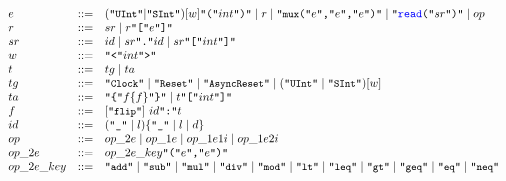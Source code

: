 \begin{figure}[htbp]
{\[\begin{array}{l l l}
%
e & ::= & (\mbox{\tt ``\prettyll{UInt}''} | \mbox{\tt ``\prettyll{SInt}''}) [w] \mbox{\tt ``(''}int\mbox{\tt ``)''} \mid r \mid \mbox{\tt ``\prettyll{mux}(''}e\mbox{\tt ``,''} e\mbox{\tt ``,''} e\mbox{\tt ``)''} 
        \mid \mbox{\tt ``\textcolor{blue}{read}(''}sr \mbox{\tt ``)''} \mid op\\
%
r & ::= & sr \mid r \mbox{\tt ``[''} e \mbox{\tt ``]''}\\
%
sr & ::= & id \mid sr\mbox{\tt ``.''}id \mid sr\mbox{\tt ``[''}int\mbox{\tt ``]''}\\
w & ::= & \mbox{\tt ``<''} int \mbox{\tt ``>''}\\
%
%
%
t & ::= & tg \mid ta \\
 tg & ::= &  \mbox{\tt ``\prettyll{Clock}''} \mid \mbox{\tt ``\prettyll{Reset}''} \mid \mbox{\tt ``\prettyll{AsyncReset}''} \mid (\mbox{\tt ``\prettyll{UInt}''} \mid \mbox{\tt ``\prettyll{SInt}''}) [w] \\
%
  ta & ::= &\mbox{\tt ``\{''} f \{f\}\mbox{\tt ``\}''} \mid t \mbox{\tt ``[''} int \mbox{\tt ``]''} \\
%
    f & ::= & [\mbox{\tt ``\prettyll{flip}''}]\ id\mbox{\tt ``:''}t\\
%
id & ::= & ( \mbox{\tt ``\_''} \mid l) \{ \mbox{\tt ``\_''} \mid l \mid d\} \\
op & ::= & op\_2e \mid op\_1e \mid op\_1e1i \mid op\_1e2i \\
op\_2e & ::= & op\_2e\_key \mbox{\tt ``(''}  e \mbox{\tt ``,''}  e \mbox{\tt ``)''} \\
%
op\_2e\_key & ::= &  \mbox{\tt ``\prettyll{add}''}  \mid  \mbox{\tt ``\prettyll{sub}''}  \mid \mbox{\tt ``\prettyll{mul}''} \mid \mbox{\tt ``\prettyll{div}''} \mid \mbox{\tt ``\prettyll{mod}''} \mid \mbox{\tt ``\prettyll{lt}''} \mid \mbox{\tt ``\prettyll{leq}''} \mid \mbox{\tt ``\prettyll{gt}''} \mid \mbox{\tt ``\prettyll{geq}''} \mid \mbox{\tt ``\prettyll{eq}''} \mid \mbox{\tt ``\prettyll{neq}''} \\

\end{array}\]}
\end{figure}
